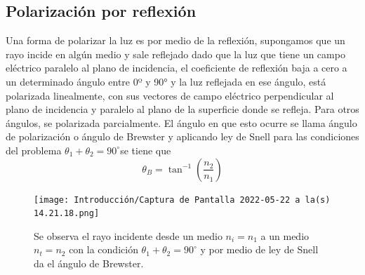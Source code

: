 \documentclass[DIV=calc, paper=a4, fontsize=10pt]{scrartcl}
\begin{document}
\subsection*{\textcolor{carmine}{Polarización por reflexión}}
Una forma de polarizar la luz es por medio de la reflexión, supongamos que un rayo incide en algún medio y sale reflejado dado que la luz que tiene un campo eléctrico paralelo al plano de incidencia, el coeficiente de reflexión baja a cero a un determinado ángulo entre 0º y 90° y la luz reflejada en ese ángulo, está polarizada linealmente, con sus vectores de campo eléctrico perpendicular al plano de incidencia y paralelo al plano de la superficie donde se refleja\cite{book}. Para otros ángulos, se polarizada parcialmente. El ángulo en que esto ocurre se llama ángulo de polarización o ángulo de Brewster y aplicando ley de Snell para las condiciones del problema $\theta_{1}+\theta_{2}=90^{\circ} $se tiene que\cite{pagina}
\begin{equation}
    \theta_{B}=\tan^{-1}\left(\frac{n_{2}}{n_{1}}\right)
\end{equation}
\begin{figure}[H]
    \centering
    \texttt{[image: Introducción/Captura de Pantalla 2022-05-22 a la(s) 14.21.18.png]}
    \caption{Se observa el rayo incidente desde un medio $n_{i}=n_{1}$ a un medio $n_{t}=n_{2}$ con la condición $\theta_{1}+\theta_{2}=90^{\circ}$ y por medio de ley de Snell da el ángulo de Brewster\cite{pagina}.}
    \label{fig:my_label}
\end{figure}
\end{document}
